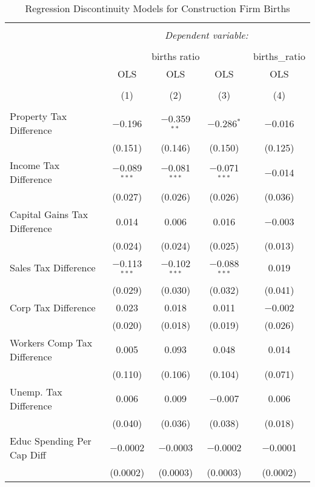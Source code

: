
\begin{table}[!htbp] \centering 
  \caption{Regression Discontinuity Models for  Construction Firm Births} 
  \label{23rd} 
\begin{tabular}{@{\extracolsep{5pt}}lcccc} 
\\[-1.8ex]\hline 
\hline \\[-1.8ex] 
 & \multicolumn{4}{c}{\textit{Dependent variable:}} \\ 
\cline{2-5} 
\\[-1.8ex] & \multicolumn{3}{c}{births ratio} & births\_ratio \\ 
 & OLS & OLS & OLS & OLS \\ 
\\[-1.8ex] & (1) & (2) & (3) & (4)\\ 
\hline \\[-1.8ex] 
 Property Tax Difference & $-$0.196 & $-$0.359$^{**}$ & $-$0.286$^{*}$ & $-$0.016 \\ 
  & (0.151) & (0.146) & (0.150) & (0.125) \\ 
  Income Tax Difference & $-$0.089$^{***}$ & $-$0.081$^{***}$ & $-$0.071$^{***}$ & $-$0.014 \\ 
  & (0.027) & (0.026) & (0.026) & (0.036) \\ 
  Capital Gains Tax Difference & 0.014 & 0.006 & 0.016 & $-$0.003 \\ 
  & (0.024) & (0.024) & (0.025) & (0.013) \\ 
  Sales Tax Difference & $-$0.113$^{***}$ & $-$0.102$^{***}$ & $-$0.088$^{***}$ & 0.019 \\ 
  & (0.029) & (0.030) & (0.032) & (0.041) \\ 
  Corp Tax Difference & 0.023 & 0.018 & 0.011 & $-$0.002 \\ 
  & (0.020) & (0.018) & (0.019) & (0.026) \\ 
  Workers Comp Tax Difference & 0.005 & 0.093 & 0.048 & 0.014 \\ 
  & (0.110) & (0.106) & (0.104) & (0.071) \\ 
  Unemp. Tax Difference & 0.006 & 0.009 & $-$0.007 & 0.006 \\ 
  & (0.040) & (0.036) & (0.038) & (0.018) \\ 
  Educ Spending Per Cap Diff & $-$0.0002 & $-$0.0003 & $-$0.0002 & $-$0.0001 \\ 
  & (0.0002) & (0.0003) & (0.0003) & (0.0002) \\ 

\end{tabular}
\end{table}
